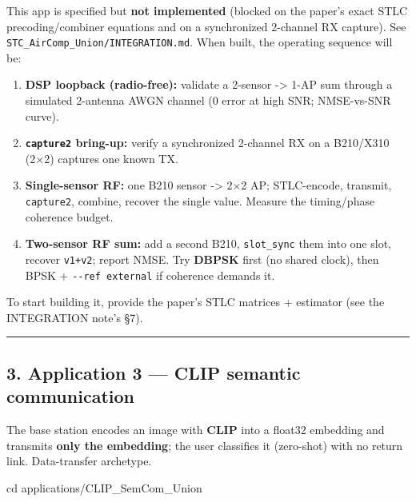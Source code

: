 \documentclass[
  9.5pt,
]{article}
\newenvironment{Shaded}{\begin{snugshade}}{\end{snugshade}}
\newcommand{\BuiltInTok}[1]{#1}
\newcommand{\NormalTok}[1]{#1}
\providecommand{\tightlist}{%
  \setlength{\itemsep}{0pt}\setlength{\parskip}{0pt}}
\begin{document}
This app is specified but \textbf{not implemented} (blocked on the
paper's exact STLC precoding/combiner equations and on a synchronized
2-channel RX capture). See \texttt{STC\_AirComp\_Union/INTEGRATION.md}.
When built, the operating sequence will be:

\begin{enumerate}
\def\labelenumi{\arabic{enumi}.}
\tightlist
\item
  \textbf{DSP loopback (radio-free):} validate a 2-sensor
  -\textgreater{} 1-AP sum through a simulated 2-antenna AWGN channel (0
  error at high SNR; NMSE-vs-SNR curve).
\item
  \textbf{\texttt{capture2} bring-up:} verify a synchronized 2-channel
  RX on a B210/X310 (2×2) captures one known TX.
\item
  \textbf{Single-sensor RF:} one B210 sensor -\textgreater{} 2×2 AP;
  STLC-encode, transmit, \texttt{capture2}, combine, recover the single
  value. Measure the timing/phase coherence budget.
\item
  \textbf{Two-sensor RF sum:} add a second B210, \texttt{slot\_sync}
  them into one slot, recover \texttt{v1+v2}; report NMSE. Try
  \textbf{DBPSK} first (no shared clock), then BPSK +
  \texttt{-\/-ref\ external} if coherence demands it.
\end{enumerate}

To start building it, provide the paper's STLC matrices + estimator (see
the INTEGRATION note's §7).

\begin{center}\rule{0.5\linewidth}{0.5pt}\end{center}

\hypertarget{3-application-3--clip-semantic-communication}{%
\subsection{3. Application 3 --- CLIP semantic
communication}\label{3-application-3--clip-semantic-communication}}

The base station encodes an image with \textbf{CLIP} into a float32
embedding and transmits \textbf{only the embedding}; the user classifies
it (zero-shot) with no return link. Data-transfer archetype.

\begin{Shaded}
\begin{Highlighting}[]
\BuiltInTok{cd}\NormalTok{ applications/CLIP\_SemCom\_Union}
\end{Highlighting}
\end{Shaded}
\end{document}
